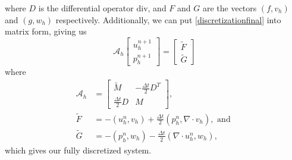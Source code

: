 \documentclass[11pt]{article}
\newcommand{\divv}{\mathrm{div}}
\begin{document}
where $D$ is the differential operator $\divv$, and $F$ and $G$ are the vectors $(f,v_h)$ and $(g,w_h)$ respectively. Additionally, we can put \eqref{discretizationfinal} into matrix form, giving us
\begin{equation}\label{FEcoeffoperator}
\mathscr{A}_h
\begin{bmatrix}
u^{n+1}_h \\
p^{n+1}_h
\end{bmatrix}
=
\begin{bmatrix}
\tilde{F}\\
\tilde{G}
\end{bmatrix}
\end{equation}
where
\begin{equation}\label{discretcoefop}
\begin{split}
\mathscr{A}_h &= \begin{bmatrix}
\tilde{M} & -\frac{\Delta t}{2}D^T \\
\frac{\Delta t}{2}D & M
\end{bmatrix},\\
\tilde{F} &= -\left(u^n_h, v_h\right) +\frac{\Delta t}{2}\left(p^n_h,\nabla \cdot v_h\right), \text{ and }\\
\tilde{G} &= -\left(p^n_h,w_h\right) - \frac{\Delta t}{2}\left(\nabla \cdot u^n_h,w_h\right),
\end{split}
\end{equation} which gives our fully discretized system.
\end{document}
